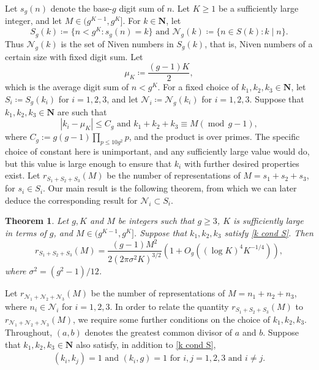 \documentclass[hidelinks,11pt,reqno]{amsart}
\renewcommand{\leq}{\leqslant}
\renewcommand{\geq}{\geqslant}
\newcommand{\N}{\ensuremath{\mathbf{N}}}
\newcommand{\st}{\ensuremath{:}}
\newcommand{\sd}[1]{s_{g}(#1)}
\newtheorem{theorem}[prop]{Theorem}
\theoremstyle{remark}
\newcommand{\md}[1]{\ensuremath{(\operatorname{mod}\, #1)}}
\begin{document}
Let $\sd{n}$ denote the base-$g$ digit sum of $n$. Let $K\geq 1$ be a sufficiently large integer, and let $M\in (g^{K-1},g^{K}]$. For $k\in \N$, let
\[S_{g}(k)\coloneq \{n<g^{K}\st \sd{n}=k\} \textrm{ and }\mathcal{N}_{g}(k)\coloneq \{n\in S(k) \st k\mid n\}.\]
Thus $\mathcal{N}_{g}(k)$ is the set of Niven numbers in $S_{g}(k)$, that is, Niven numbers of a certain size with fixed digit sum. Let \begin{equation*}
    \mu_{K}\coloneq \frac{(g-1)K}{2},
\end{equation*}
which is the average digit sum of $n<g^{K}$. For a fixed choice of $k_{1},k_{2},k_{3}\in \N$, let $S_{i}\coloneq S_{g}(k_{i})$ for $i=1,2,3$, and let $\mathcal{N}_{i}\coloneq \mathcal{N}_{g}(k_{i})$ for $i=1,2,3$. Suppose that $k_{1},k_{2},k_{3}\in \N$ are such that
\begin{equation}\label{k cond S}
    |k_{i}-\mu_{K}|\leq C_{g} \textrm{ and } k_{1}+k_{2}+k_{3}\equiv M\md{g-1},
\end{equation}
where $C_g := g(g-1)\prod_{p\leq 10g^{2}}p$, and the product is over primes.  The specific choice of constant here is unimportant, and any sufficiently large value would do, but this value is large enough to ensure that $k_{i}$ with further desired properties exist. Let $r_{S_{1}+S_{2}+S_{3}}(M)$ be the number of representations of $M=s_{1}+s_{2}+s_{3}$, for $s_{i}\in S_{i}$. Our main result is the following theorem, from which we can later deduce the corresponding result for $\mathcal{N}_{i}\subset S_{i}$.
\begin{theorem}\label{Main theorem S count} Let $g,K$ and $M$ be integers such that $g\geq 3$, $K$ is sufficiently large in terms of $g$, and $M\in (g^{K-1},g^{K}]$. Suppose that $k_{1},k_{2},k_{3}$ satisfy \cref{k cond S}. Then
    \[r_{S_{1}+S_{2}+S_{3}}(M)=\frac{(g-1)M^{2}}{2(2\pi\sigma^{2}K)^{3/2}}(1+O_{g}((\log K)^{4}K^{-1/4})),\]
where $\sigma^{2}=(g^{2}-1)/12$.
\end{theorem}
Let $r_{\mathcal{N}_{1}+\mathcal{N}_{2}+\mathcal{N}_{3}}(M)$ be the number of representations of $M=n_{1}+n_{2}+n_{3}$, where $n_{i}\in \mathcal{N}_{i}$ for $i=1,2,3$. In order to relate the quantity $r_{S_{1}+S_{2}+S_{3}}(M)$ to $r_{\mathcal{N}_{1}+\mathcal{N}_{2}+\mathcal{N}_{3}}(M)$, we require some further conditions on the choice of $k_{1},k_{2},k_{3}$. Throughout, $(a,b)$ denotes the greatest common divisor of $a$ and $b$. Suppose that $k_{1},k_{2},k_{3}\in\N$ also satisfy, in addition to \cref{k cond S},
\begin{align}\label{k cond N}
  (k_{i},k_{j})=1 \textrm{ and }(k_{i},g)=1 \textrm{ for }i,j=1,2,3 \textrm{ and } i\neq j.
 \end{align}
\end{document}
